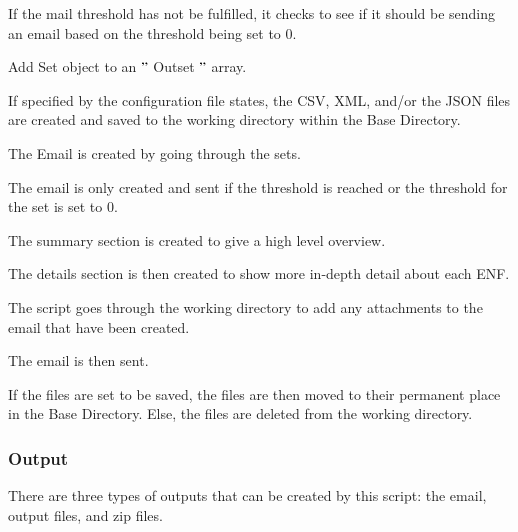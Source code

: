 \documentclass[a4paper,12pt]{report}
\begin{document}
\begin{myEnumerate}
\begin{myEnumerate}
\item If the mail threshold has not be fulfilled, it checks to see if it should be sending an email based on the threshold being set to 0. \par
\item Add Set object to an  $ " $ Outset $ " $  array. \par
\end{myEnumerate}
\item If specified by the configuration file states, the CSV, XML, and/or the JSON files are created and saved to the working directory within the Base Directory. \par
\item The Email is created by going through the sets. \par
\begin{myEnumerate}
\item The email is only created and sent if the threshold is reached or the threshold for the set is set to 0. \par
\item The summary section is created to give a high level overview. \par
\item The details section is then created to show more in-depth detail about each ENF. \par
\item The script goes through the working directory to add any attachments to the email that have been created. \par
\item The email is then sent. \par
\end{myEnumerate}
\item If the files are set to be saved, the files are then moved to their permanent place in the Base Directory. Else, the files are deleted from the working directory. \par
\end{myEnumerate}
\subsubsection*{Output}
 \par
There are three types of outputs that can be created by this script: the email, output files, and zip files. \par
\end{document}
